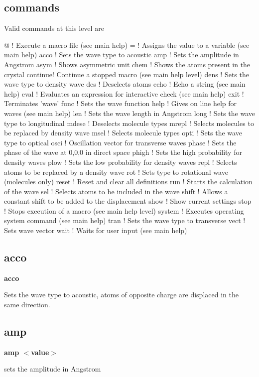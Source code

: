 \subsection*{commands}
Valid commands at this level are 
\par
\begin{MacVerbatim}
@       ! Execute a macro file (see main help)
=       ! Assigns the value to a variable (see main help)
acco    ! Sets the wave type to acoustic
amp     ! Sets the amplitude in Angstrom
asym    ! Shows asymmetric unit
chem    ! Shows the atoms present in the crystal
continue! Continue a stopped macro (see main help level)
dens    ! Sets the wave type to density wave
des     ! Deselects atoms
echo    ! Echo a string (see main help)
eval    ! Evaluates an expression for interactive check (see main help)
exit    ! Terminates 'wave'
func    ! Sets the wave function
help    ! Gives on line help for waves (see main help)
len     ! Sets the wave length in Angstrom
long    ! Sets the wave type to longitudinal
mdese   ! Deselects molecule types
mrepl   ! Selects molecules to be replaced by density wave
msel    ! Selects molecule types
opti    ! Sets the wave type to optical
osci    ! Oscillation vector for transverse waves
phase   ! Sets the phase of the wave at 0,0,0 in direct space
phigh   ! Sets the high probability for density waves
plow    ! Sets the low probability for density waves
repl    ! Selects atoms to be replaced by a density wave
rot     ! Sets type to rotational wave (molecules only)
reset   ! Reset and clear all definitions
run     ! Starts the calculation of the wave
sel     ! Selects atoms to be included in the wave
shift   ! Allows a constant shift to be added to the displacement
show    ! Show current settings
stop    ! Stops execution of a macro (see main help level)
system  ! Executes operating system command (see main help)
tran    ! Sets the wave type to transverse
vect    ! Sets wave vector
wait    ! Waits for user input (see main help)
\end{MacVerbatim}
\subsection*{acco}
{\bf acco \par }
\par
\vspace{3pt}
Sets the wave type to acoustic, atoms of opposite charge are 
displaced in the same direction. 
\subsection*{amp}
{\bf amp $ <$value$> $ \par }
\par
\vspace{3pt}
sets the amplitude in Angstrom 
